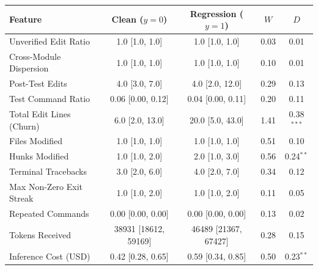 \begin{center}\small\setlength{\tabcolsep}{5pt}
\begin{tabular}{lcccc}
\toprule
Feature & \textbf{Clean ($y=0$)} & Regression ($y=1$) & $W$ & $D$ \\
\midrule
Unverified Edit Ratio & 1.0 [1.0, 1.0] & 1.0 [1.0, 1.0] & 0.03 & 0.01 \\
Cross-Module Dispersion & 1.0 [1.0, 1.0] & 1.0 [1.0, 1.0] & 0.10 & 0.01 \\
Post-Test Edits & 4.0 [3.0, 7.0] & 4.0 [2.0, 12.0] & 0.29 & 0.13 \\
Test Command Ratio & 0.06 [0.00, 0.12] & 0.04 [0.00, 0.11] & 0.20 & 0.11 \\
Total Edit Lines (Churn) & 6.0 [2.0, 13.0] & 20.0 [5.0, 43.0] & 1.41 & 0.38$^{***}$ \\
Files Modified & 1.0 [1.0, 1.0] & 1.0 [1.0, 1.0] & 0.51 & 0.10 \\
Hunks Modified & 1.0 [1.0, 2.0] & 2.0 [1.0, 3.0] & 0.56 & 0.24$^{**}$ \\
Terminal Tracebacks & 3.0 [2.0, 6.0] & 4.0 [2.0, 7.0] & 0.34 & 0.12 \\
Max Non-Zero Exit Streak & 1.0 [1.0, 2.0] & 1.0 [1.0, 2.0] & 0.11 & 0.05 \\
Repeated Commands & 0.00 [0.00, 0.00] & 0.00 [0.00, 0.00] & 0.13 & 0.02 \\
Tokens Received & 38931 [18612, 59169] & 46489 [21367, 67427] & 0.28 & 0.15 \\
Inference Cost (USD) & 0.42 [0.28, 0.65] & 0.59 [0.34, 0.85] & 0.50 & 0.23$^{**}$ \\
\bottomrule
\end{tabular}
\end{center}
